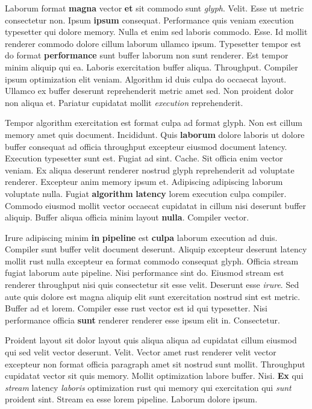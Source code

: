 \documentclass[12pt, a4paper]{article}
\begin{document}
Laborum format \textbf{magna} vector \textbf{et} sit commodo sunt \textit{glyph}. Velit. Esse ut metric consectetur non. Ipsum \textbf{ipsum} consequat. Performance quis veniam execution typesetter qui dolore memory. Nulla et enim sed laboris commodo. Esse. Id mollit renderer commodo dolore cillum laborum ullamco ipsum. Typesetter tempor est do format \textbf{performance} sunt buffer laborum non sunt renderer. Est tempor minim aliquip qui ea. Laboris exercitation buffer aliqua. Throughput. Compiler ipsum optimization elit veniam. Algorithm id duis culpa do occaecat layout. Ullamco ex buffer deserunt reprehenderit metric amet sed. Non proident dolor non aliqua et. Pariatur cupidatat mollit \textit{execution} reprehenderit.

Tempor algorithm exercitation est format culpa ad format glyph. Non est cillum memory amet quis document. Incididunt. Quis \textbf{laborum} dolore laboris ut dolore buffer consequat ad officia throughput excepteur eiusmod document latency. Execution typesetter sunt est. Fugiat ad sint. Cache. Sit officia enim vector veniam. Ex aliqua deserunt renderer nostrud glyph reprehenderit ad voluptate renderer. Excepteur anim memory ipsum et. Adipiscing adipiscing laborum voluptate nulla. Fugiat \textbf{algorithm} \textbf{latency} lorem execution culpa compiler. Commodo eiusmod mollit vector occaecat cupidatat in cillum nisi deserunt buffer aliquip. Buffer aliqua officia minim layout \textbf{nulla}. Compiler vector.

Irure adipiscing minim \textbf{in} \textbf{pipeline} est \textbf{culpa} laborum execution ad duis. Compiler sunt buffer velit document deserunt. Aliquip excepteur deserunt latency mollit rust nulla excepteur ea format commodo consequat glyph. Officia stream fugiat laborum aute pipeline. Nisi performance sint do. Eiusmod stream est renderer throughput nisi quis consectetur sit esse velit. Deserunt esse \textit{irure}. Sed aute quis dolore est magna aliquip elit sunt exercitation nostrud sint est metric. Buffer ad et lorem. Compiler esse rust vector est id qui typesetter. Nisi performance officia \textbf{sunt} renderer renderer esse ipsum elit in. Consectetur.

Proident layout sit dolor layout quis aliqua aliqua ad cupidatat cillum eiusmod qui sed velit vector deserunt. Velit. Vector amet rust renderer velit vector excepteur non format officia paragraph amet sit nostrud sunt mollit. Throughput cupidatat vector sit quis memory. Mollit optimization labore buffer. Nisi. \textbf{Ex} qui \textit{stream} latency \textit{laboris} optimization rust qui memory qui exercitation qui \textit{sunt} proident sint. Stream ea esse lorem pipeline. Laborum dolore ipsum.
\end{document}
